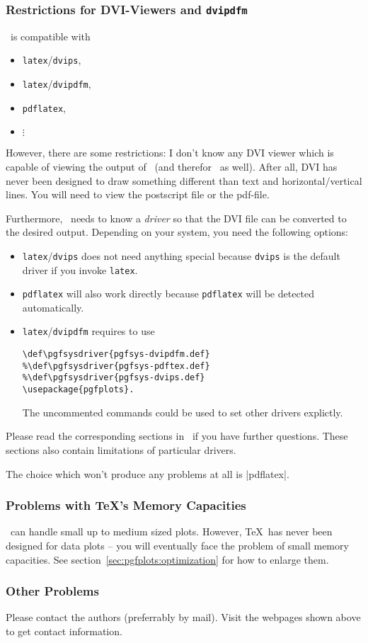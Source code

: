 \subsubsection{Restrictions for DVI-Viewers and \texttt{dvipdfm}}
\label{sec:drivers}%
\PGF\ is compatible with 
\begin{itemize}
	\item \lstinline!latex!/\lstinline!dvips!,
	\item \lstinline!latex!/\lstinline!dvipdfm!,
	\item \lstinline!pdflatex!,
	\item $\vdots$
\end{itemize}
However, there are some restrictions: I don't know any DVI viewer which is capable of viewing the output of \PGF\ (and therefor \PGFPlots\ as well). After all, DVI has never been designed to draw something different than text and horizontal/vertical lines. You will need to view the postscript file or the pdf-file.

Furthermore, \PGF\ needs to know a \emph{driver} so that the DVI file can be converted to the desired output. Depending on your system, you need the following options:
\begin{itemize}
	\item \lstinline!latex!/\lstinline!dvips! does not need anything special because \lstinline!dvips! is the default driver if you invoke \lstinline!latex!.
	\item \lstinline!pdflatex! will also work directly because \lstinline!pdflatex! will be detected automatically.
	\item \lstinline!latex!/\lstinline!dvipdfm! requires to use
\begin{verbatim}
\def\pgfsysdriver{pgfsys-dvipdfm.def}
%\def\pgfsysdriver{pgfsys-pdftex.def}
%\def\pgfsysdriver{pgfsys-dvips.def}
\usepackage{pgfplots}.
\end{verbatim}
	The uncommented commands could be used to set other drivers explictly.
\end{itemize}
Please read the corresponding sections in~\cite[Section 7.2.1 and 7.2.2]{tikz} if you have further questions. These sections also contain limitations of particular drivers.

The choice which won't produce any problems at all is |pdflatex|.

\subsubsection{Problems with \TeX's Memory Capacities}
\PGFPlots\ can handle small up to medium sized plots. However, \TeX\ has never been designed for data plots -- you will eventually face the problem of small memory capacities. See section~\ref{sec:pgfplots:optimization} for how to enlarge them.

\subsubsection{Other Problems}
Please contact the authors (preferrably by mail). Visit the webpages shown above to get contact information.
